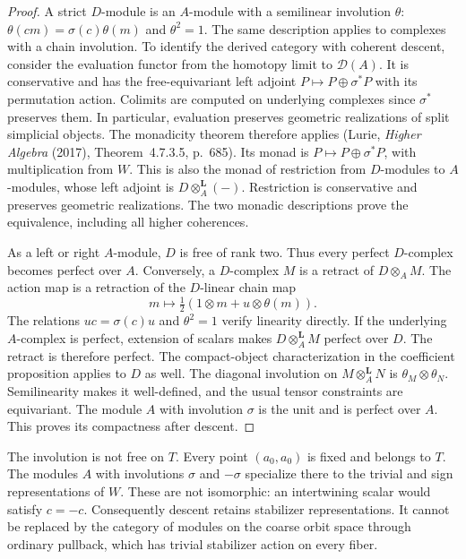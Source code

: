 \begin{proof}
A strict $D$-module is an $A$-module with a semilinear involution $\theta$:
$\theta(cm)=\sigma(c)\theta(m)$ and $\theta^2=1$.
The same description applies to complexes with a chain involution.
To identify the derived category with coherent descent, consider the
evaluation functor from the homotopy limit to $\mathcal D(A)$.
It is conservative and has the free-equivariant left adjoint
$P\mapsto P\oplus\sigma^*P$ with its permutation action.
Colimits are computed on underlying complexes since $\sigma^*$ preserves them.
In particular, evaluation preserves geometric realizations of split simplicial objects.
The monadicity theorem therefore applies
(Lurie, \emph{Higher Algebra} (2017), Theorem~4.7.3.5, p.~685).
Its monad is $P\mapsto P\oplus\sigma^*P$, with multiplication from $W$.
This is also the monad of restriction from $D$-modules to $A$-modules,
whose left adjoint is $D\otimes_A^{\mathbf L}(-)$.
Restriction is conservative and preserves geometric realizations.
The two monadic descriptions prove the equivalence, including all higher coherences.

As a left or right $A$-module, $D$ is free of rank two.
Thus every perfect $D$-complex becomes perfect over $A$.
Conversely, a $D$-complex $M$ is a retract of $D\otimes_A M$.
The action map is a retraction of the $D$-linear chain map
\[
 m\longmapsto\tfrac12(1\otimes m+u\otimes\theta(m)).
\]
The relations $uc=\sigma(c)u$ and $\theta^2=1$ verify linearity directly.
If the underlying $A$-complex is perfect, extension of scalars makes
$D\otimes_A^{\mathbf L}M$ perfect over $D$.
The retract is therefore perfect.
The compact-object characterization in the coefficient proposition applies to $D$ as well.
The diagonal involution on $M\otimes_A^{\mathbf L}N$ is
$\theta_M\otimes\theta_N$.
Semilinearity makes it well-defined, and the usual tensor constraints are equivariant.
The module $A$ with involution $\sigma$ is the unit and is perfect over $A$.
This proves its compactness after descent.
\end{proof}

The involution is not free on $T$.
Every point $(a_0,a_0)$ is fixed and belongs to $T$.
The modules $A$ with involutions $\sigma$ and $-\sigma$ specialize there
to the trivial and sign representations of $W$.
These are not isomorphic: an intertwining scalar would satisfy $c=-c$.
Consequently descent retains stabilizer representations.
It cannot be replaced by the category of modules on the coarse orbit space
through ordinary pullback, which has trivial stabilizer action on every fiber.

